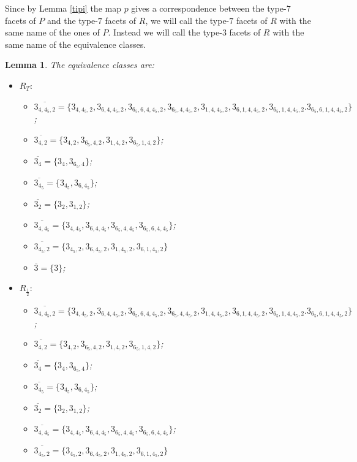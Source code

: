 \documentclass{amsart}
\newtheorem{lemma}{Lemma}[section]
\theoremstyle{definition}
\theoremstyle{remark}
\begin{document}
Since by Lemma \ref{tipi} the map $p$ gives a correspondence between the type-$7$ facets of $P$ and the type-$7$ facets of $R$, we will call the type-$7$ facets of $R$ with the same name of the ones of $P$. Instead we will call the type-$3$ facets of $R$ with the same name of the equivalence classes.

\begin{lemma}
\label{facce}
    The equivalence classes are:
    \begin{itemize}
        \item $R_T:$
        \begin{itemize}
            \item $\overline{3_{4,4_5,2}}=\{3_{4,4_5,2},3_{6,4,4_5,2},3_{6_5,6,4,4_5,2},3_{6_5,4,4_5,2},3_{1,4,4_5,2},3_{6,1,4,4_5,2},3_{6_5,1,4,4_5,2}.3_{6_5,6,1,4,4_5,2}\}$;
            \item $\overline{3_{4,2}}=\{3_{4,2},3_{6_5,4,2},3_{1,4,2},3_{6_5,1,4,2}\}$;
            \item $\overline{3_4}=\{3_4,3_{6_5,4}\}$;
            \item $\overline{3_{4_5}}=\{3_{4_5},3_{6,4_5}\}$;
            \item $\overline{3_2}=\{3_2,3_{1,2}\}$;
            \item $\overline{3_{4,4_5}}=\{3_{4,4_5},3_{6,4,4_5},3_{6_5,4,4_5},3_{6_5,6,4,4_5}\}$;
            \item $\overline{3_{4_5,2}}=\{3_{4_5,2},3_{6,4_5,2},3_{1,4_5,2},3_{6,1,4_5,2}\}$
            \item $\overline{3}=\{3\}$;
        \end{itemize}
        \item $R_{\frac{1}{2}}:$
        \begin{itemize}
            \item $\overline{3_{4,4_5,2}}=\{3_{4,4_5,2},3_{6,4,4_5,2},3_{6_5,6,4,4_5,2},3_{6_5,4,4_5,2},3_{1,4,4_5,2},3_{6,1,4,4_5,2},3_{6_5,1,4,4_5,2}.3_{6_5,6,1,4,4_5,2}\}$;
            \item $\overline{3_{4,2}}=\{3_{4,2},3_{6_5,4,2},3_{1,4,2},3_{6_5,1,4,2}\}$;
            \item $\overline{3_4}=\{3_4,3_{6_5,4}\}$;
            \item $\overline{3_{4_5}}=\{3_{4_5},3_{6,4_5}\}$;
            \item $\overline{3_2}=\{3_2,3_{1,2}\}$;
            \item $\overline{3_{4,4_5}}=\{3_{4,4_5},3_{6,4,4_5},3_{6_5,4,4_5},3_{6_5,6,4,4_5}\}$;
            \item $\overline{3_{4_5,2}}=\{3_{4_5,2},3_{6,4_5,2},3_{1,4_5,2},3_{6,1,4_5,2}\}$

\end{itemize}
\end{itemize}
\end{lemma}
\end{document}
